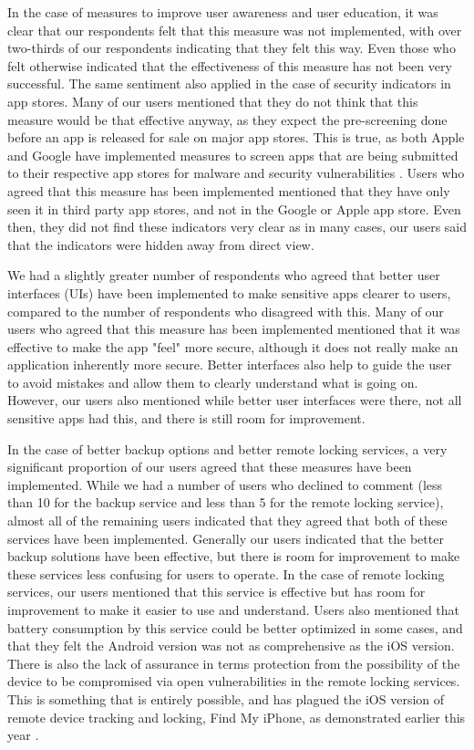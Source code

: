 \documentclass{sigchi}
\begin{document}
In the case of measures to improve user awareness and user education, it was clear that our respondents felt that this measure was not implemented, with over two-thirds of our respondents indicating that they felt this way. Even those who felt otherwise indicated that the effectiveness of this measure has not been very successful. The same sentiment also applied in the case of security indicators in app stores. Many of our users mentioned that they do not think that this measure would be that effective anyway, as they expect the pre-screening done before an app is released for sale on major app stores. This is true, as both Apple and Google have implemented measures to screen apps that are being submitted to their respective app stores for malware and security vulnerabilities \cite{apple} \cite{krill_2012}. Users who agreed that this measure has been implemented mentioned that they have only seen it in third party app stores, and not in the Google or Apple app store. Even then, they did not find these indicators very clear as in many cases, our users said that the indicators were hidden away from direct view.

We had a slightly greater number of respondents who agreed that better user interfaces (UIs) have been implemented to make sensitive apps clearer to users, compared to the number of respondents who disagreed with this. Many of our users who agreed that this measure has been implemented mentioned that it was effective to make the app "feel" more secure, although it does not really make an application inherently more secure. Better interfaces also help to guide the user to avoid mistakes and allow them to clearly understand what is going on. However, our users also mentioned while better user interfaces were there, not all sensitive apps had this, and there is still room for improvement.

In the case of better backup options and better remote locking services, a very significant proportion of our users agreed that these measures have been implemented. While we had a number of users who declined to comment (less than 10 for the backup service and less than 5 for the remote locking service), almost all of the remaining users indicated that they agreed that both of these services have been implemented. Generally our users indicated that the better backup solutions have been effective, but there is room for improvement to make these services less confusing for users to operate. In the case of remote locking services, our users mentioned that this service is effective but has room for improvement to make it easier to use and understand. Users also mentioned that battery consumption by this service could be better optimized in some cases, and that they felt the Android version was not as comprehensive as the iOS version. There is also the lack of assurance in terms protection from the possibility of the device to be compromised via open vulnerabilities in the remote locking services. This is something that is entirely possible, and has plagued the iOS version of remote device tracking and locking, Find My iPhone, as demonstrated earlier this year \cite{vigneswaren_2016}.
\end{document}
